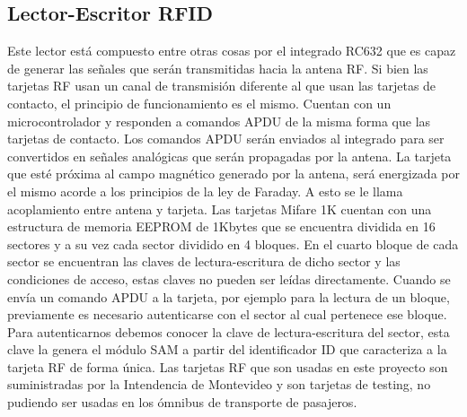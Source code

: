 \subsection{Lector-Escritor RFID}
Este lector está compuesto entre otras cosas por el integrado RC632 que es capaz de
generar las señales que serán transmitidas hacia la antena RF. Si bien las tarjetas RF
usan un canal de transmisión diferente al que usan las tarjetas de contacto, el
principio de funcionamiento es el mismo. Cuentan con un microcontrolador y
responden a comandos APDU de la misma forma que las tarjetas de contacto. Los
comandos APDU serán enviados al integrado para ser convertidos en señales
analógicas que serán propagadas por la antena. La tarjeta que esté próxima al campo
magnético generado por la antena, será energizada por el mismo acorde a los
principios de la ley de Faraday. A esto se le llama acoplamiento entre antena y tarjeta.
Las tarjetas Mifare 1K cuentan con una estructura de memoria EEPROM de 1Kbytes
que se encuentra dividida en 16 sectores y a su vez cada sector dividido en 4 bloques.
En el cuarto bloque de cada sector se encuentran las claves de lectura-escritura de
dicho sector y las condiciones de acceso, estas claves no pueden ser leídas
directamente.
Cuando se envía un comando APDU a la tarjeta, por ejemplo para la lectura de un
bloque, previamente es necesario autenticarse con el sector al cual pertenece ese
bloque. Para autenticarnos debemos conocer la clave de lectura-escritura del sector,
esta clave la genera el módulo SAM a partir del identificador ID que caracteriza a
la tarjeta RF de forma única.
Las tarjetas RF que son usadas en este proyecto son suministradas por la Intendencia
de Montevideo y son tarjetas de testing, no pudiendo ser usadas en los ómnibus de
transporte de pasajeros.

